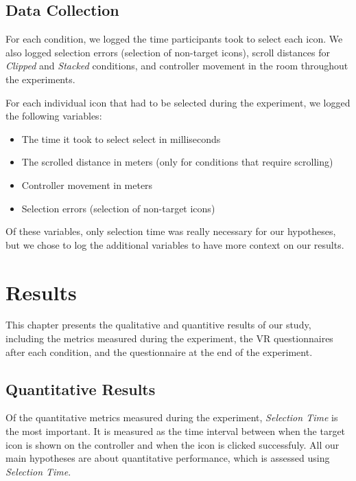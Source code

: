 \documentclass{tufte-book} %
\begin{document}
\section{Data Collection}
For each condition, we logged the time participants took to select each icon. We also logged selection errors (selection of non-target icons), scroll distances for \emph{Clipped} and \emph{Stacked} conditions, and controller movement in the room throughout the experiments.

For each individual icon that had to be selected during the experiment, we logged the following variables:

\begin{itemize}
  \item The time it took to select select in milliseconds
  \item The scrolled distance in meters (only for conditions that require scrolling)
  \item Controller movement in meters
  \item Selection errors (selection of non-target icons)
\end{itemize}


Of these variables, only selection time was really necessary for our hypotheses, but we chose to log the additional variables to have more context on our results.



\chapter{Results}
\label{ch:results}

This chapter presents the qualitative and quantitive results of our study, including the metrics measured during the experiment, the VR questionnaires after each condition, and the questionnaire at the end of the experiment.

\section{Quantitative Results}
Of the quantitative metrics measured during the experiment, \emph{Selection Time} is the most important. It is measured as the time interval between when the target icon is shown on the controller and when the icon is clicked successfuly. All our main hypotheses are about quantitative performance, which is assessed using \emph{Selection Time}.
\end{document}
